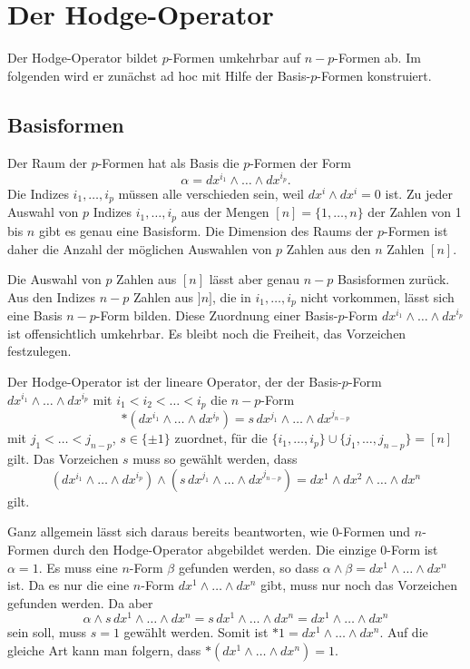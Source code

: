 %
%
%
\section{Der Hodge-Operator
\label{buch:hodge:section:hodge}}
Der Hodge-Operator bildet $p$-Formen umkehrbar auf $n-p$-Formen ab.
Im folgenden wird er zunächst ad hoc mit Hilfe der Basis-$p$-Formen
konstruiert.

%
%
\subsection{Basisformen}
Der Raum der $p$-Formen hat als Basis die $p$-Formen der Form
\[
\alpha = dx^{i_1}\wedge\dots\wedge dx^{i_p}.
\]
Die Indizes $i_1,\dots,i_p$ müssen alle verschieden sein, weil
$dx^i\wedge dx^i=0$ ist.
Zu jeder Auswahl von $p$ Indizes $i_1,\dots,i_p$ aus der Mengen
$[n]=\{1,\dots,n\}$ der Zahlen von 1 bis $n$ gibt es genau eine Basisform.
Die Dimension des Raums der $p$-Formen ist daher die Anzahl der möglichen
Auswahlen von $p$ Zahlen aus den $n$ Zahlen $[n]$.

Die Auswahl von $p$ Zahlen aus $[n]$ lässt aber genau $n-p$ Basisformen
zurück.
Aus den Indizes $n-p$ Zahlen aus $]n]$, die in $i_1,\dots,i_p$ nicht
vorkommen, lässt sich eine Basis $n-p$-Form bilden.
Diese Zuordnung einer Basis-$p$-Form $dx^{i_1}\wedge\dots\wedge dx^{i_p}$
ist offensichtlich umkehrbar.
Es bleibt noch die Freiheit, das Vorzeichen festzulegen.

\begin{definition}
\label{buch:hodge:hodge:definition:hodge}
Der Hodge-Operator ist der lineare Operator, der der
Basis-$p$-Form
$dx^{i_1}\wedge\dots\wedge dx^{i_p}$ mit $i_1<i_2<\dots<i_p$
die $n-p$-Form
\[
\ast(dx^{i_1}\wedge\dots\wedge dx^{i_p})
=
s\,dx^{j_1}\wedge\dots\wedge dx^{j_{n-p}}
\]
mit $j_1<\dots <j_{n-p}$, $s\in\{\pm1\}$ zuordnet, für die
$\{i_1,\dots,i_p\}\cup\{j_1,\dots,j_{n-p}\}=[n]$ gilt.
Das Vorzeichen $s$ muss so gewählt werden, dass
\[
(dx^{i_1}\wedge\dots\wedge dx^{i_p})
\wedge
(s\,dx^{j_1}\wedge\dots\wedge dx^{j_{n-p}})
=
dx^1\wedge dx^2\wedge\dots\wedge dx^n
\]
gilt.
\end{definition}

Ganz allgemein lässt sich daraus bereits beantworten, wie $0$-Formen und
$n$-Formen durch den Hodge-Operator abgebildet werden.
Die einzige 0-Form ist $\alpha=1$.
Es muss eine $n$-Form $\beta$ gefunden werden, so dass
$\alpha\wedge\beta=dx^1\wedge\dots\wedge dx^n$ ist.
Da es nur die eine $n$-Form $dx^1\wedge\dots\wedge dx^n$ gibt, muss
nur noch das Vorzeichen gefunden werden.
Da aber
\[
\alpha\wedge
s\,dx^1\wedge\dots\wedge dx^n
=
s\,dx^1\wedge\dots\wedge dx^n
=
dx^1\wedge\dots\wedge dx^n
\]
sein soll, muss $s=1$ gewählt werden.
Somit ist $\ast 1=dx^1\wedge\dots\wedge dx^n$.
Auf die gleiche Art kann man folgern, dass
$\ast(dx^1\wedge\dots\wedge dx^n)=1$.

